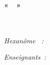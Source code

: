 \begin{center}
	\vspace*{8cm}
	\textsc{\Large \reportsubject}\\[0.3cm]
	\HRule \\[0.4cm]
	{\Huge \bfseries \reporttitle}\\[0.3cm]
	{\LARGE \bfseries «~\stagetopic~»}\\[0.3cm]
	{\Large \dateperiod}\\[0.4cm]
	\HRule \\[1cm]

	\begin{minipage}[t]{0.4\textwidth}
	  \begin{flushleft} \large
	    \emph{Hexanôme \textbf{\hexanome}~:}\\
	    \small \reportauthor
	  \end{flushleft}
	\end{minipage}
	\begin{minipage}[t]{0.5\textwidth}
	  \begin{flushright} \large
	    \emph{Enseignants~:} \\
		\enseignants
	  \end{flushright}
	\end{minipage}
\end{center}
